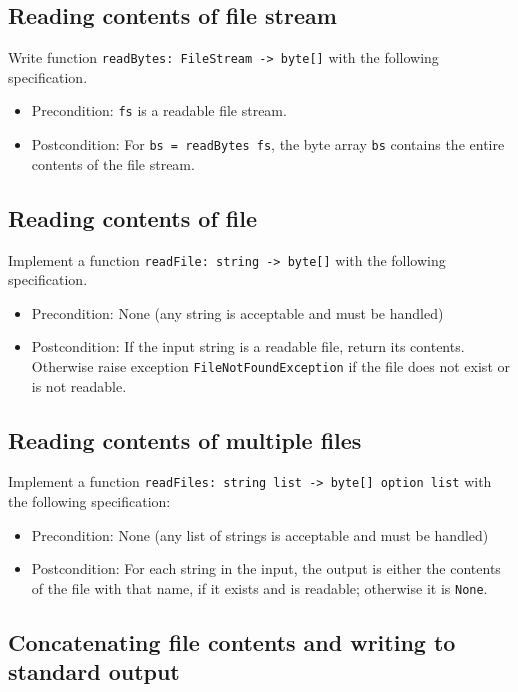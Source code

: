 \documentclass[a4paper,11pt]{article}
\begin{document}
\subsection{Reading contents of file stream}

Write function \texttt{readBytes: FileStream -> byte[]} with the following specification.  
\begin{itemize}
\item Precondition: \texttt{fs} is a readable file stream.
\item Postcondition: For \texttt{bs = readBytes fs}, the byte array \texttt{bs} contains the entire contents of the file stream.   
\end{itemize}

\subsection{Reading contents of file}

Implement a function \texttt{readFile: string -> byte[]} with the following specification. 
\begin{itemize}
\item Precondition: None (any string is acceptable and must be handled)
\item Postcondition: If the input string is a readable file, return its contents.  Otherwise raise exception \texttt{FileNotFoundException} if the file does not exist or is not readable.
\end{itemize}

\subsection{Reading contents of multiple files}
 
Implement a function \texttt{readFiles: string list -> byte[] option list} with the following specification:
\begin{itemize}
\item Precondition: None (any list of strings is acceptable and must be handled)
\item Postcondition: For each string in the input, the output is either the contents of the file with that name, if it exists and is readable; otherwise it is \texttt{None}.  
\end{itemize}

\subsection{Concatenating file contents and writing to standard output}
\end{document}
